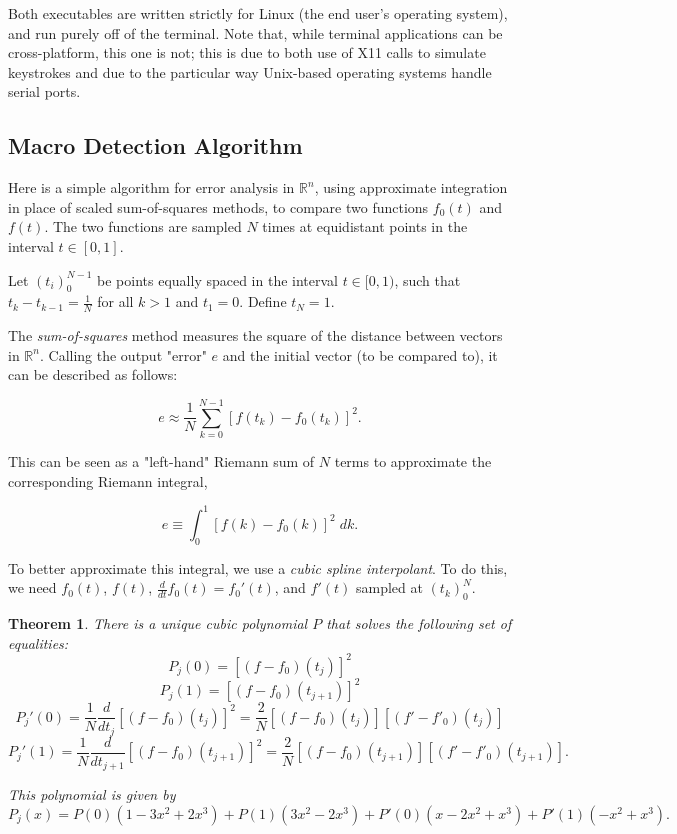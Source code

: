 \documentclass{article}
\newtheorem{theorem}{Theorem}
\begin{document}
	Both executables are written strictly for Linux (the end user's operating system), and run purely off of the terminal. Note that, while terminal applications can be cross-platform, this one is not; this is due to both use of X11 calls to simulate keystrokes and due to the particular way Unix-based operating systems handle serial ports.
	\subsection*{Macro Detection Algorithm}
	
	Here is a simple algorithm for error analysis in $\mathbb{R}^n$, using approximate integration in place of scaled sum-of-squares methods, to compare two functions $f_0(t)$ and $f(t)$. The two functions are sampled $N$ times at equidistant points in the interval $t\in[0,1]$.
	
	Let $(t_i)_0^{N-1}$ be points equally spaced in the interval $t\in[0,1)$, such that $t_k-t_{k-1}=\frac{1}{N}$ for all $k>1$ and $t_1=0$. Define $t_{N}=1$. 
	
	The \emph{sum-of-squares} method measures the square of the distance between vectors in $\mathbb{R}^n$. Calling the output "error" $e$ and the initial vector (to be compared to), it can be described as follows:
	
	\begin{equation} e \approx \frac{1}{N}\sum\limits_{k=0}^{N-1} [f(t_k)-f_0(t_k)]^2 .\end{equation}
	
	This can be seen as a "left-hand" Riemann sum of $N$ terms to approximate the corresponding Riemann integral,
	
	$$e \equiv \int_0^1 [f(k)-f_0(k)]^2\;dk.$$
	
	To better approximate this integral, we use a \emph{cubic spline interpolant}. To do this, we need $f_0(t)$, $f(t)$, $\frac{d}{dt}f_0(t)=f_0'(t)$, and $f'(t)$ sampled at $(t_k)_0^N$.
	
	\begin{theorem}
		There is a unique cubic polynomial $P$ that solves the following set of equalities:
		$$P_j(0)=[(f-f_0)(t_j)]^2$$
		$$P_j(1)=[(f-f_0)(t_{j+1})]^2$$
		$$P_j'(0)=\frac{1}{N}\frac{d}{dt_j}[(f-f_0)(t_j)]^2=\frac{2}{N}[(f-f_0)(t_j)][(f'-f'_0)(t_j)]$$
		$$P_j'(1)=\frac{1}{N}\frac{d}{dt_{j+1}}[(f-f_0)(t_{j+1})]^2=\frac{2}{N}[(f-f_0)(t_{j+1})][(f'-f'_0)(t_{j+1})].$$
		
		This polynomial is given by 
		$$P_j(x)=P(0)(1-3x^2+2x^3)+P(1)(3x^2-2x^3)+P'(0)(x-2x^2+x^3)+P'(1)(-x^2+x^3).$$
	\end{theorem}
	
\end{document}
